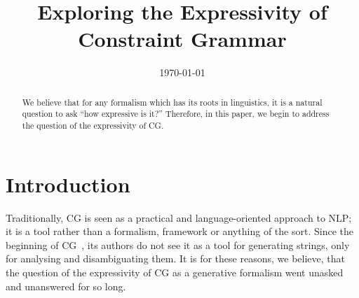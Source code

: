 \documentclass[11pt]{article}
\title{Exploring the Expressivity of Constraint Grammar}
\date{\today}
\begin{document}
\maketitle

\begin{abstract}
  We believe that for any formalism which has its roots in linguistics, it is a
  natural question to ask ``how expressive is it?''
  Therefore, in this paper, we begin to address the question of the expressivity
  of CG.  
\end{abstract}

\section{Introduction}
Traditionally, CG is seen as a practical and language-oriented approach to NLP;
it is a tool rather than a formalism, framework or anything of the sort.
Since the beginning of CG~\cite{karlsson1995constraint}, its authors do not
see it as a tool for generating strings, only for analysing and disambiguating
them.
It is for these reasons, we believe, that the question of the expressivity of CG
as a generative formalism went unasked and unanswered for so long.
\end{document}
